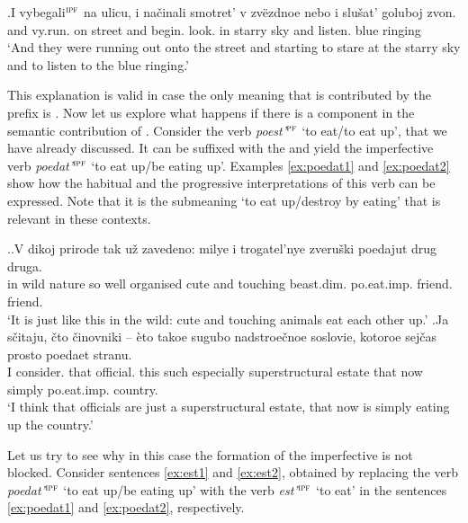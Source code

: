 \exg.\label{ex:vybegat}I vybegali$^{\textsc{ipf}}$ na ulicu, i na\v{c}inali smotret' v zv\"{e}zdnoe nebo i slu\v{s}at' goluboj zvon.\\
and vy.run. on street and begin. look. in starry sky and listen. blue ringing\\
\trans `And they were running out onto the street and starting to stare at the starry sky and to listen to the blue ringing.'

This explanation is valid in case the only meaning that is contributed by the prefix is . Now let us explore what happens if there is a  component in the semantic contribution of . Consider the verb \textit{poest'}$^{\textsc{pf}}$ `to eat/to eat up', that we have already discussed. It can be suffixed with the  and yield the imperfective verb \textit{poedat'}$^{\textsc{ipf}}$ `to eat up/be eating up'. Examples \ref{ex:poedat1} and \ref{ex:poedat2} show how the habitual and the progressive interpretations of this verb can be expressed. Note that it is the submeaning `to eat up/destroy by eating' that is relevant in these contexts.

\ex.\ag.\label{ex:poedat1}V dikoj prirode tak u\v{z} zavedeno: milye i trogatel'nye zveru\v{s}ki poedajut drug druga.\\
in wild nature so well organised cute and touching beast.dim. po.eat.imp. friend. friend.\\
\trans `It is just like this in the wild: cute and touching animals eat each other up.'
\bg.\label{ex:poedat2}Ja s\v{c}itaju, \v{c}to \v{c}inovniki -- \`{e}to takoe sugubo nadstroe\v{c}noe soslovie, kotoroe sej\v{c}as prosto poedaet stranu.\\
I consider. that official. {} this such especially superstructural estate that now simply po.eat.imp. country.\\
\trans `I think that officials are just a superstructural estate, that now is simply eating up the country.'\\

Let us try to see why in this case the formation of the imperfective is not blocked. Consider sentences \ref{ex:est1} and \ref{ex:est2}, obtained by replacing the verb \textit{poedat'}$^{\textsc{ipf}}$ `to eat up/be eating up' with the verb \textit{est'}$^{\textsc{ipf}}$ `to eat' in the sentences \ref{ex:poedat1} and \ref{ex:poedat2}, respectively.
 
